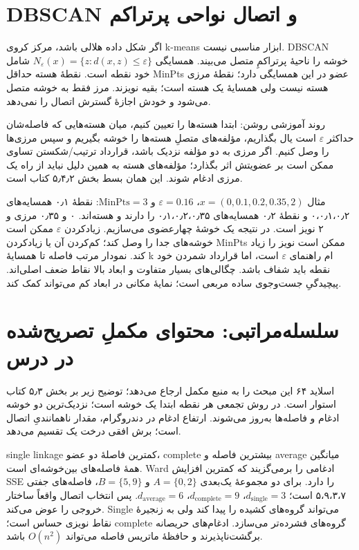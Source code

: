 \documentclass[12pt,a4paper,oneside]{report}
\begin{document}
\section{DBSCAN و اتصال نواحی پرتراکم}

اگر شکل داده هلالی باشد، مرکز کروی k-means ابزار مناسبی نیست. DBSCAN خوشه را ناحیهٔ پرتراکمِ متصل می‌بیند. همسایگی \(N_\varepsilon(x)=\{z:d(x,z)\le\varepsilon\}\) شامل خود نقطه است. نقطهٔ هسته حداقل MinPts عضو در این همسایگی دارد؛ نقطهٔ مرزی هسته نیست ولی همسایهٔ یک هسته است؛ بقیه نویزند. مرز فقط به خوشه متصل می‌شود و خودش اجازهٔ گسترش اتصال را نمی‌دهد.

روند آموزشی روشن: ابتدا هسته‌ها را تعیین کنیم، میان هسته‌هایی که فاصله‌شان حداکثر $\varepsilon$ است یال بگذاریم، مؤلفه‌های متصلِ هسته‌ها را خوشه بگیریم و سپس مرزی‌ها را وصل کنیم. اگر مرزی به دو مؤلفه نزدیک باشد، قرارداد ترتیب/شکستن تساوی ممکن است بر عضویتش اثر بگذارد؛ مؤلفه‌های هسته به همین دلیل نباید از راه یک مرزی ادغام شوند. این همان بسط بخش ۵٫۴٫۲ کتاب است.

مثال \(x=(0,0.1,0.2,0.35,2)\)، $\varepsilon=0.16$ و $\mathrm{MinPts}=3$: نقطهٔ ۰٫۱ همسایه‌های ۰،۰٫۱،۰٫۲ و نقطهٔ ۰٫۲ همسایه‌های ۰٫۱،۰٫۲،۰٫۳۵ را دارند و هسته‌اند. ۰ و ۰٫۳۵ مرزی و ۲ نویز است. در نتیجه یک خوشهٔ چهارعضوی می‌سازیم. زیادکردن $\varepsilon$ ممکن است خوشه‌های جدا را وصل کند؛ کم‌کردن آن یا زیادکردن MinPts ممکن است نویز را زیاد کند. نمودار مرتب فاصله تا همسایهٔ k ام راهنمای $\varepsilon$ است، اما قرارداد شمردن خود نقطه باید شفاف باشد. چگالی‌های بسیار متفاوت و ابعاد بالا نقاط ضعف اصلی‌اند. پیچیدگیِ جست‌وجوی ساده مربعی است؛ نمایهٔ مکانی در ابعاد کم می‌تواند کمک کند.

\section{سلسله‌مراتبی: محتوای مکملِ تصریح‌شده در درس}

اسلاید ۶۴ این مبحث را به منبع مکمل ارجاع می‌دهد؛ توضیح زیر بر بخش ۵٫۳ کتاب استوار است. در روش تجمعی هر نقطه ابتدا یک خوشه است؛ نزدیک‌ترین دو خوشه ادغام و فاصله‌ها به‌روز می‌شوند. ارتفاع ادغام در دندروگرام، مقدار ناهمانندیِ اتصال است؛ برش افقی درخت یک تقسیم می‌دهد.

single linkage کمترین فاصلهٔ دو عضو، complete بیشترین فاصله و average میانگین همهٔ فاصله‌های بین‌خوشه‌ای است. Ward ادغامی را برمی‌گزیند که کمترین افزایش SSE را دارد. برای دو مجموعهٔ یک‌بعدی $A=\{0,2\}$ و $B=\{5,9\}$، فاصله‌های جفتی ۵،۹،۳،۷ است؛ $d_{\mathrm{single}}=3$، $d_{\mathrm{complete}}=9$، $d_{\mathrm{average}}=6$. پس انتخاب اتصال واقعاً ساختار خروجی را عوض می‌کند. Single می‌تواند گروه‌های کشیده را پیدا کند ولی به زنجیرهٔ نقاط نویزی حساس است؛ complete گروه‌های فشرده‌تر می‌سازد. ادغام‌های حریصانه برگشت‌ناپذیرند و حافظهٔ ماتریس فاصله می‌تواند \(O(n^2)\) باشد.
\end{document}

